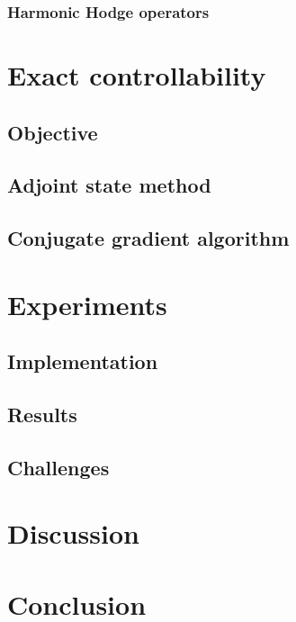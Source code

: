 \documentclass[utf8,english]{gradu3}
\begin{document}

\subsection{Harmonic Hodge operators}



\chapter{Exact controllability}


\section{Objective}

\section{Adjoint state method}

\section{Conjugate gradient algorithm}



\chapter{Experiments}

\section{Implementation}

\section{Results}

\section{Challenges}




\chapter{Discussion}



\chapter{Conclusion}



\printbibliography
\end{document}
